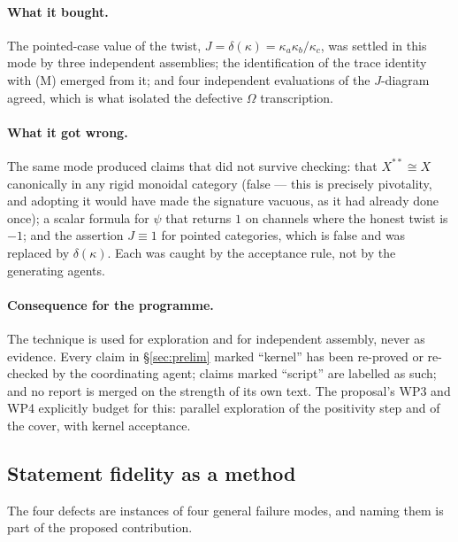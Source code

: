 \documentclass[11pt,a4paper]{article}
\theoremstyle{remark}
\begin{document}
\paragraph{What it bought.} The pointed-case value of the twist, $J = \delta(\kappa) =
\kappa_a\kappa_b/\kappa_c$, was settled in this mode by three independent assemblies; the
identification of the trace identity with (M) emerged from it; and four independent evaluations
of the $J$-diagram agreed, which is what isolated the defective $\Omega$ transcription.

\paragraph{What it got wrong.} The same mode produced claims that did not survive checking: that
$X^{**} \cong X$ canonically in any rigid monoidal category (false --- this is precisely
pivotality, and adopting it would have made the signature vacuous, as it had already done once);
a scalar formula for $\psi$ that returns $1$ on channels where the honest twist is $-1$; and the
assertion $J \equiv 1$ for pointed categories, which is false and was replaced by
$\delta(\kappa)$. Each was caught by the acceptance rule, not by the generating agents.

\paragraph{Consequence for the programme.} The technique is used for exploration and for
independent assembly, never as evidence. Every claim in \S\ref{sec:prelim} marked ``kernel'' has
been re-proved or re-checked by the coordinating agent; claims marked ``script'' are labelled as
such; and no report is merged on the strength of its own text. The proposal's WP3 and WP4
explicitly budget for this: parallel exploration of the positivity step and of the cover, with
kernel acceptance.

\subsection{Statement fidelity as a method}\label{sec:fidelity}

The four defects are instances of four general failure modes, and naming them is part of the
proposed contribution.
\end{document}
